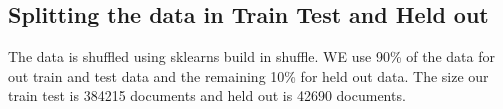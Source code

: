 \subsection{Splitting the data in Train Test and Held out} \label{methodology:dimreduction}
The data is shuffled using sklearns build in shuffle. WE use 90\% of the data for out train and test data and the remaining 10\% for held out data. The size our train test is 384215 documents and held out is 42690 documents.

